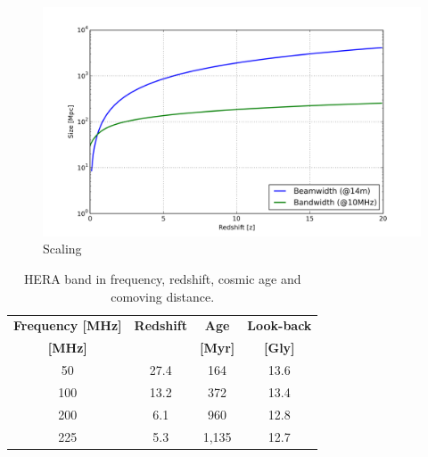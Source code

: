 \documentclass[ars]{/Users/daviddeboer1/Documents/Papers/Copernicus_LaTeX_Package_v_2_7/copernicus}
\begin{document}
\begin{figure}[t]
\vspace*{2mm}
\begin{center}
\includegraphics[width=\columnwidth]{plots/heraXY.png}
\end{center}
\caption{Scaling  \label{fig:heraXY}}
\end{figure}





\begin{table}[t]
\caption{HERA band in frequency, redshift, cosmic age and comoving distance.}
\label{tab:heraband}
\vskip4mm
\centering
\begin{tabular}{| c | c | c | c |} \hline
\textbf{Frequency [MHz]} & \textbf{Redshift} & \textbf{Age} & \textbf{Look-back} \\
\textbf{[MHz]}                   &                            & \textbf{[Myr]}  & \textbf{[Gly]} \\ \hline
50 & 27.4    & 164 & 13.6 \\ \hline
100 & 13.2  & 372 & 13.4 \\ \hline
200  & 6.1    & 960  & 12.8 \\ \hline
225  &  5.3   & 1,135  &  12.7 \\ \hline
\end{tabular}
\end{table}
\end{document}
